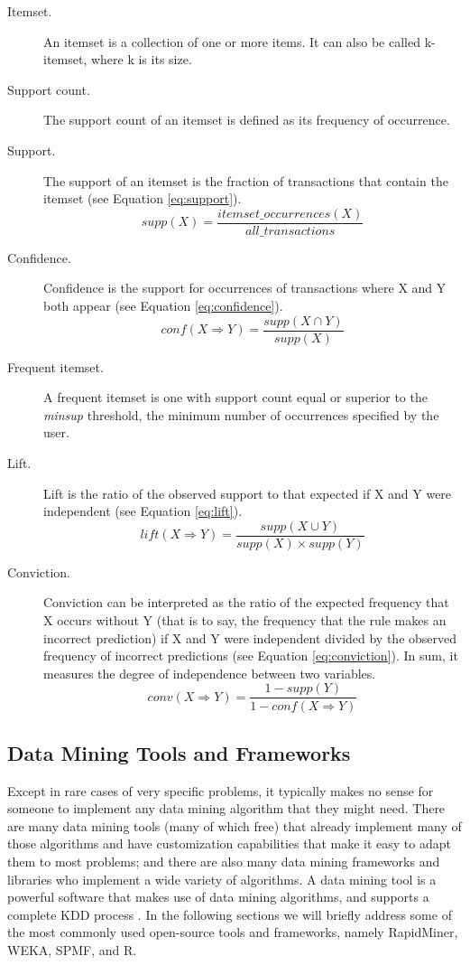 \begin{description}
	\item[Itemset.] An itemset is a collection of one or more items. It can also be called k-itemset, where k is its size.
	\item[Support count.] The support count of an itemset is defined as its frequency of occurrence. 
	\item[Support.] The support of an itemset is the fraction of transactions that contain the itemset (see Equation \ref{eq:support}). 
		\begin{equation}\label{eq:support}
			supp(X) =\frac{itemset\_occurrences(X)}{all\_transactions}
		\end{equation}
	\item[Confidence.] Confidence is the support for occurrences of transactions where X and Y both appear (see Equation \ref{eq:confidence}). 
		\begin{equation}\label{eq:confidence}
			conf(X \Rightarrow Y) =\frac{supp(X \cap Y)}{supp(X)}
		\end{equation}
	\item[Frequent itemset.] A frequent itemset is one with support count equal or superior to the \textit{minsup} threshold, the minimum number of occurrences specified by the user.
	\item[Lift.] Lift is the ratio of the observed support to that expected if X and Y were independent (see Equation \ref{eq:lift}). 
		\begin{equation} \label{eq:lift}
			lift(X \Rightarrow Y)=\frac{supp(X \cup Y)}{supp(X) \times supp(Y)}
		\end{equation}
	\item[Conviction.] Conviction  can be interpreted as the ratio of the expected frequency that X occurs without Y (that is to say, the frequency that the rule makes an incorrect prediction) if X and Y were independent divided by the observed frequency of incorrect predictions (see Equation \ref{eq:conviction}). In sum, it measures the degree of independence between two variables.
		\begin{equation} \label{eq:conviction}
			 conv(X \Rightarrow Y)=\frac{1-supp(Y)}{1-conf(X\Rightarrow Y)}
		\end{equation}
\end{description}
\subsection{Data Mining Tools and Frameworks}\label{sec:dmtools}
Except in rare cases of very specific problems, it typically makes no sense for someone to implement any data mining algorithm that they might need. There are many data mining tools (many of which free) that already implement many of those algorithms and have customization capabilities that make it easy to adapt them to most problems; and there are also many data mining frameworks and libraries who implement a wide variety of algorithms. A data mining tool is a powerful software that makes use of data mining algorithms, and supports a complete KDD process \cite{mikut2011data}. In the following sections we will briefly address some of the most commonly used open-source tools and frameworks, namely RapidMiner, WEKA, SPMF, and R. 

